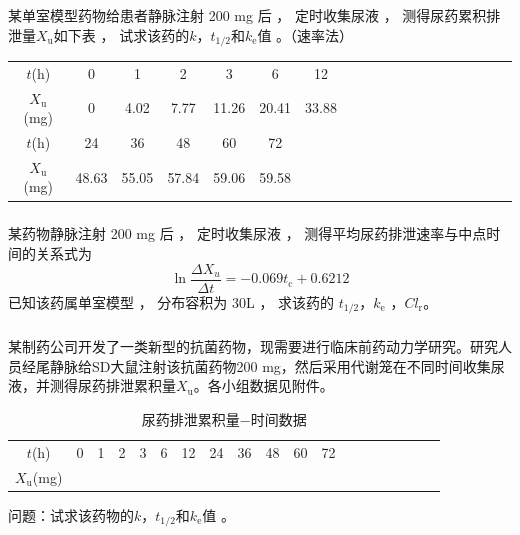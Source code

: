 \documentclass[dvipsnames, svgnames, x11names]{beamer}
\begin{document}
\begin{frame}[t]
    \frametitle{}
    \begin{example}
        某单室模型药物给患者静脉注射 200 mg 后 ， 定时收集尿液 ， 测得尿药累积排泄量$X_{\mathrm{u}}$如下表 ， 试求该药的$k$，$t_{1/2}$和$k_\mathrm{e}$值 。（速率法）
        \begin{table}
            \centering
            \begin{tabular}{ccccccccccccccccccc}
                \bottomrule
                $t$(h) & 0 & 1 &  2 & 3 & 6 &  12 \\
                $X_{\mathrm{u}}$(mg) & 0 & 4.02 & 7.77  & 11.26 & 20.41 &  33.88 \\ \hline
                $t$(h) & 24 & 36 & 48  & 60 & 72  \\
                $X_{\mathrm{u}}$(mg)  & 48.63 & 55.05 & 57.84  & 59.06 & 59.58 \\ \toprule
            \end{tabular}
        \end{table}
    \end{example}
\end{frame}


\begin{frame}[t]
    \frametitle{}
    \begin{question}
        某药物静脉注射 200 mg 后 ， 定时收集尿液 ， 测得平均尿药排泄速率与中点时间的关系式为
        \[
            \ln \frac{\Delta X_{u}}{\Delta t}=-0.069t_{\mathrm{c}}+0.6212
        \]
         已知该药属单室模型 ， 分布容积为 30L ， 求该药的 $t_{1/2}$，$k_\mathrm{e}$ ，$Cl_{\mathrm{r}}$。
    \end{question}
\end{frame}


\begin{frame}[t]
    \frametitle{}
    \begin{question}
        某制药公司开发了一类新型的抗菌药物，现需要进行临床前药动力学研究。研究人员经尾静脉给SD大鼠注射该抗菌药物200 mg，然后采用代谢笼在不同时间收集尿液，并测得尿药排泄累积量$X_\mathrm{u}$。各小组数据见附件。
        \begin{table}
            \centering
            \caption{尿药排泄累积量$-$时间数据}
            \begin{tabular}{ccccccccccccccccccc}
                \bottomrule
                $t$(h) & 0 & 1 &  2 & 3 & 6 &  12 & 24 & 36 & 48  & 60 & 72 \\
                $X_{\mathrm{u}}$(mg) &  &  &   &  &  &  &  &  &  &  &   \\  \toprule
            \end{tabular}
        \end{table}
        问题：试求该药物的$k$，$t_{1/2}$和$k_\mathrm{e}$值 。
    \end{question}
\end{frame}
\end{document}
